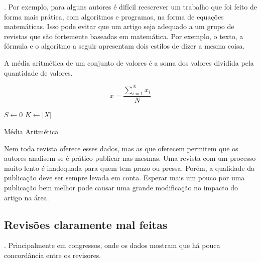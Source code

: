 \documentclass[openany]{book}
\begin{document}
. Por exemplo, para alguns autores é difícil reescrever um trabalho que foi feito de forma mais prática, com algoritmos e programas, na forma de equações matemáticas. Isso pode evitar que um artigo seja adequado a um grupo de revistas que são fortemente baseadas em matemática. Por exemplo, o texto, a fórmula e o algoritmo a seguir apresentam dois estilos de dizer  a mesma coisa.

A média aritmética de um conjunto de valores é a soma dos valores dividida pela quantidade de valores.

\begin{equation}
    \bar{x} = \frac{\sum\limits_{i=1}^{N}x_i}{N}
\end{equation}

\begin{algorithm}
    $S \leftarrow 0$ \;
    $K \leftarrow |X|$ \;
\caption{Média Aritmética}
\end{algorithm}


 Nem toda revista oferece esses dados, mas as que oferecem permitem que os autores analisem se é prático publicar nas mesmas. Uma revista com um processo muito lento é inadequada para quem tem prazo ou pressa. Porém, a qualidade da publicação deve ser sempre levada em conta. Esperar mais um pouco por uma publicação bem melhor pode causar uma grande modificação no impacto do artigo na área.


\subsection{Revisões claramente mal feitas}


. Principalmente em congressos, onde os dados mostram que há pouca concordância entre os revisores\favorcitar.
\end{document}
